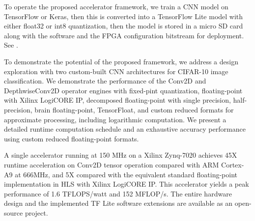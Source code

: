 To operate the proposed accelerator framework, we train a CNN model on TensorFlow or Keras, then this is converted into a TensorFlow Lite model with either float32 or int8 quantization, then the model is stored in a micro SD card along with the software and the FPGA configuration bitstream for deployment. See .

To demonstrate the potential of the proposed framework, we address a design exploration with two custom-built CNN architectures for CIFAR-10 image classification. We demonstrate the performance of the Conv2D and DepthwiseConv2D operator engines with fixed-pint quantization, floating-point with Xilinx LogiCORE IP, decomposed floating-point with single precision, half-precision, brain floating-point, TensorFloat, and custom reduced formats for approximate processing, including logarithmic computation. We present a detailed runtime computation schedule and an exhaustive accuracy performance using custom reduced floating-point formats.

A single accelerator running at 150 MHz on a Xilinx Zynq-7020 achieves 45X runtime acceleration on Conv2D tensor operation compared with ARM Cortex-A9 at 666MHz, and 5X compared with the equivalent standard floating-point implementation in HLS with Xilinx LogiCORE IP. This accelerator yields a peak performance of 1.6 TFLOPS/watt and 152 MFLOP/s. The entire hardware design and the implemented TF Lite software extensions are available as an open-source project.